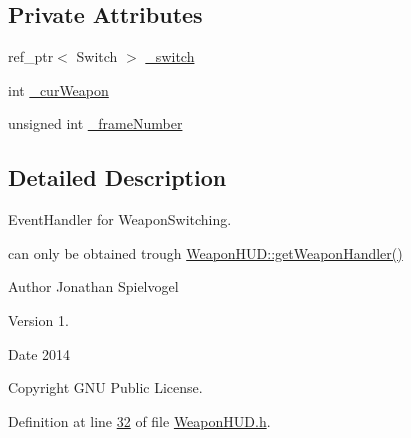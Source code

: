 \subsection*{Private Attributes}
\begin{DoxyCompactItemize}
\item 
ref\+\_\+ptr$<$ Switch $>$ \hyperlink{classbrtr_1_1_weapon_h_u_d_1_1_weapon_switch_handler_af4b40e431f9cbcaddf843578316bb9c4}{\+\_\+switch}
\item 
int \hyperlink{classbrtr_1_1_weapon_h_u_d_1_1_weapon_switch_handler_a15b23d25cb1847f558493adc2a97311e}{\+\_\+cur\+Weapon}
\item 
unsigned int \hyperlink{classbrtr_1_1_weapon_h_u_d_1_1_weapon_switch_handler_abfa6e6c2904d1e6ed7cd5d029a632ddf}{\+\_\+frame\+Number}
\end{DoxyCompactItemize}


\subsection{Detailed Description}
Event\+Handler for Weapon\+Switching. 

can only be obtained trough \hyperlink{classbrtr_1_1_weapon_h_u_d_a6a9a434ff3aa3861caf030763772ac74}{Weapon\+H\+U\+D\+::get\+Weapon\+Handler()} \begin{DoxyAuthor}{Author}
Jonathan Spielvogel 
\end{DoxyAuthor}
\begin{DoxyVersion}{Version}
1. 
\end{DoxyVersion}
\begin{DoxyDate}{Date}
2014 
\end{DoxyDate}
\begin{DoxyCopyright}{Copyright}
G\+N\+U Public License. 
\end{DoxyCopyright}


Definition at line \hyperlink{_weapon_h_u_d_8h_source_l00032}{32} of file \hyperlink{_weapon_h_u_d_8h_source}{Weapon\+H\+U\+D.\+h}.



